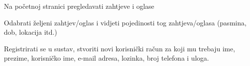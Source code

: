 			
			\begin{packed_enum}
				\item  {}
				
				\begin{packed_enum}
					
					\item Na početnoj stranici pregledavati zahtjeve i oglase
					\item Odabrati željeni zahtjev/oglas i vidjeti pojedinosti tog zahtjeva/oglasa (pasmina, dob, lokacija itd.)
					\item Registrirati se u sustav, stvoriti novi korisnički račun za koji mu trebaju ime, prezime, korisničko ime, e-mail adresa, lozinka, broj telefona i uloga.
				\end{packed_enum}
				
				\item  {}
				
				\begin{packed_enum}
					

\end{packed_enum}
\end{packed_enum}
